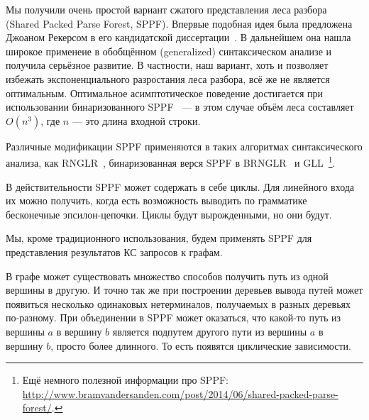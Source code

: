Мы получили очень простой вариант сжатого представления леса разбора (Shared Packed Parse Forest, SPPF).
Впервые подобная идея была предложена Джоаном Рекерсом в его кандидатской диссертации~\cite{SPPF}.
В дальнейшем она нашла широкое применеие в обобщённом (generalized) синтаксическом анализе и получила серьёзное развитие.
В частности, наш вариант, хоть и позволяет избежать экспоненциального разростания леса разбора, всё же не является оптимальным.
Оптимальное асимптотическое поведение достигается при использовании бинаризованного SPPF~\cite{Billot:1989:SSF:981623.981641} --- в этом случае объём леса составляет $O(n^3)$, где $n$ --- это длина входной строки.

Различные модификации SPPF применяются в таких алгоритмах синтаксического анализа, как RNGLR~\cite{Scott:2006:RNG:1146809.1146810}, бинаризованная верся SPPF в BRNGLR~\cite{Scott:2007:BCT:1289813.1289815} и GLL~\cite{Scott:2010:GP:1860132.1860320,10.1007/978-3-662-46663-6_5}\footnote{Ещё немного полезной информации про SPPF: \url{http://www.bramvandersanden.com/post/2014/06/shared-packed-parse-forest/}.}.

В действительности SPPF может содержать в себе циклы. Для линейного входа их можно получить, когда есть возможность выводить по грамматике бесконечные эпсилон-цепочки. Циклы будут вырожденными, но они будут.

Мы, кроме традиционного использования, будем применять SPPF для представления результатов КС запросов к графам.

В графе может существовать множество способов получить путь из одной вершины в другую. И точно так же при построении деревьев вывода путей может появиться несколько одинаковых нетерминалов, получаемых в разных деревьях по-разному. При объединении в SPPF может оказаться, что какой-то путь из вершины $a$ в вершину $b$ является подпутем другого пути из вершины $a$ в вершину $b$, просто более длинного. То есть появятся циклические зависимости.

